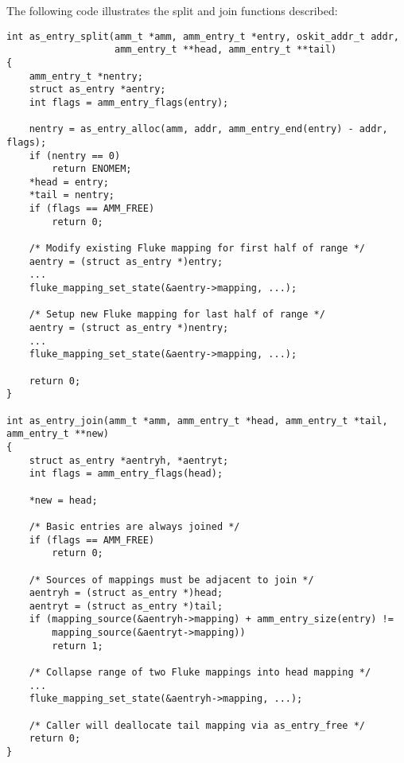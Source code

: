 The following code illustrates the split and join functions described:
\begin{codefrag}
\footnotesize
\begin{verbatim}
int as_entry_split(amm_t *amm, amm_entry_t *entry, oskit_addr_t addr,
                   amm_entry_t **head, amm_entry_t **tail)
{
    amm_entry_t *nentry;
    struct as_entry *aentry;
    int flags = amm_entry_flags(entry);

    nentry = as_entry_alloc(amm, addr, amm_entry_end(entry) - addr, flags);
    if (nentry == 0)
        return ENOMEM;
    *head = entry;
    *tail = nentry;
    if (flags == AMM_FREE)
        return 0;

    /* Modify existing Fluke mapping for first half of range */
    aentry = (struct as_entry *)entry;
    ...
    fluke_mapping_set_state(&aentry->mapping, ...);

    /* Setup new Fluke mapping for last half of range */
    aentry = (struct as_entry *)nentry;
    ...
    fluke_mapping_set_state(&aentry->mapping, ...);

    return 0;
}

int as_entry_join(amm_t *amm, amm_entry_t *head, amm_entry_t *tail, amm_entry_t **new)
{
    struct as_entry *aentryh, *aentryt;
    int flags = amm_entry_flags(head);

    *new = head;

    /* Basic entries are always joined */
    if (flags == AMM_FREE)
        return 0;

    /* Sources of mappings must be adjacent to join */
    aentryh = (struct as_entry *)head;
    aentryt = (struct as_entry *)tail;
    if (mapping_source(&aentryh->mapping) + amm_entry_size(entry) !=
        mapping_source(&aentryt->mapping))
        return 1;

    /* Collapse range of two Fluke mappings into head mapping */
    ...
    fluke_mapping_set_state(&aentryh->mapping, ...);

    /* Caller will deallocate tail mapping via as_entry_free */
    return 0;
}
\end{verbatim}
\end{codefrag}

